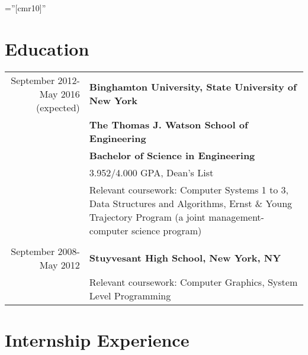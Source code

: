 \documentclass[letterpaper,10pt]{article} %
\begin{document}
\pagestyle{empty} %

\font\fb=''[cmr10]'' %

\par{\par} %
\par{\par}
\par{\par}
\par{\par}

\section{Education}

\begin{longtable}{r|p{4.25in}}	
    September 2012-May 2016 (expected) & \textbf{Binghamton University, State University of New York} \\
    & \textbf{The Thomas J. Watson School of Engineering} \\
    & \textbf{Bachelor of Science in Engineering} \\
    & 3.952/4.000 GPA, Dean's List \\
    & Relevant coursework: Computer Systems 1 to 3, Data Structures and Algorithms,
    Ernst \& Young Trajectory Program \footnotesize{(a joint management-computer science program)} \\

    \multicolumn{2}{c}{} \\

    September 2008-May 2012 & \textbf{Stuyvesant High School, New York, NY} \\
    & Relevant coursework: Computer Graphics, System Level Programming \\
\end{longtable}

\section{Internship Experience}
\end{document}
